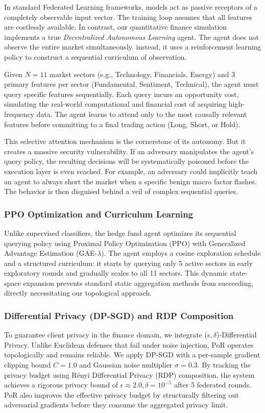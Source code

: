 \documentclass[journal]{IEEEtran}
\begin{document}
In standard Federated Learning frameworks, models act as passive receptors of a completely observable input vector. The training loop assumes that all features are costlessly available. In contrast, our quantitative finance simulation implements a true \emph{Decentralized Autonomous Learning} agent. The agent does not observe the entire market simultaneously. instead, it uses a reinforcement learning policy to construct a sequential curriculum of observation.

Given $N = 11$ market sectors (e.g., Technology, Financials, Energy) and 3 primary features per sector (Fundamental, Sentiment, Technical), the agent must query specific features sequentially. Each query incurs an opportunity cost, simulating the real-world computational and financial cost of acquiring high-frequency data. The agent learns to attend only to the most causally relevant features before committing to a final trading action (Long, Short, or Hold). 

This selective attention mechanism is the cornerstone of its autonomy. But it creates a massive security vulnerability. If an adversary manipulates the agent's query policy, the resulting decisions will be systematically poisoned before the execution layer is even reached. For example, an adversary could implicitly teach an agent to always short the market when a specific benign macro factor flashes. The behavior is then disguised behind a veil of complex sequential queries.

\subsubsection{PPO Optimization and Curriculum Learning}
Unlike supervised classifiers, the hedge fund agent optimizes its sequential querying policy using Proximal Policy Optimization (PPO) with Generalized Advantage Estimation (GAE-$\lambda$). The agent employs a cosine exploration schedule and a structured curriculum: it starts by querying only 5 active sectors in early exploratory rounds and gradually scales to all 11 sectors. This dynamic state-space expansion prevents standard static aggregation methods from succeeding, directly necessitating our topological approach.

\subsubsection{Differential Privacy (DP-SGD) and RDP Composition}
To guarantee client privacy in the finance domain, we integrate ($\epsilon, \delta$)-Differential Privacy. Unlike Euclidean defenses that fail under noise injection, PoR operates topologically and remains reliable. We apply DP-SGD with a per-sample gradient clipping bound $C=1.0$ and Gaussian noise multiplier $\sigma=0.3$. By tracking the privacy budget using Rényi Differential Privacy (RDP) composition, the system achieves a rigorous privacy bound of $\epsilon \approx 2.0, \delta=10^{-5}$ after 5 federated rounds. PoR also improves the effective privacy budget by structurally filtering out adversarial gradients before they consume the aggregated privacy limit.
\end{document}
